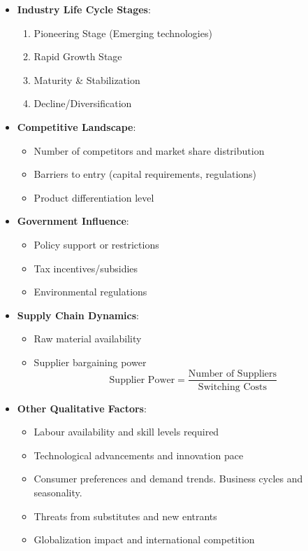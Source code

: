 \documentclass[12pt]{article}
\begin{document}
\begin{itemize}
\item \textbf{Industry Life Cycle Stages}:
    \begin{enumerate}
    \item Pioneering Stage (Emerging technologies)
    \item Rapid Growth Stage
    \item Maturity \& Stabilization
    \item Decline/Diversification
    \end{enumerate}
    
\item \textbf{Competitive Landscape}:
    \begin{itemize}
    \item Number of competitors and market share distribution
    \item Barriers to entry (capital requirements, regulations)
    \item Product differentiation level
    \end{itemize}

\item \textbf{Government Influence}:
    \begin{itemize}
    \item Policy support or restrictions
    \item Tax incentives/subsidies
    \item Environmental regulations
    \end{itemize}

\item \textbf{Supply Chain Dynamics}:
    \begin{itemize}
    \item Raw material availability
    \item Supplier bargaining power
    \[
    \text{Supplier Power} = \frac{\text{Number of Suppliers}}{\text{Switching Costs}}
    \]
    \end{itemize}

\item \textbf{Other Qualitative Factors}:
    \begin{itemize}
    \item Labour availability and skill levels required
    \item Technological advancements and innovation pace
    \item Consumer preferences and demand trends. Business cycles and seasonality.
    \item Threats from substitutes and new entrants
    \item Globalization impact and international competition
    \end{itemize}


\end{itemize}
\end{document}
